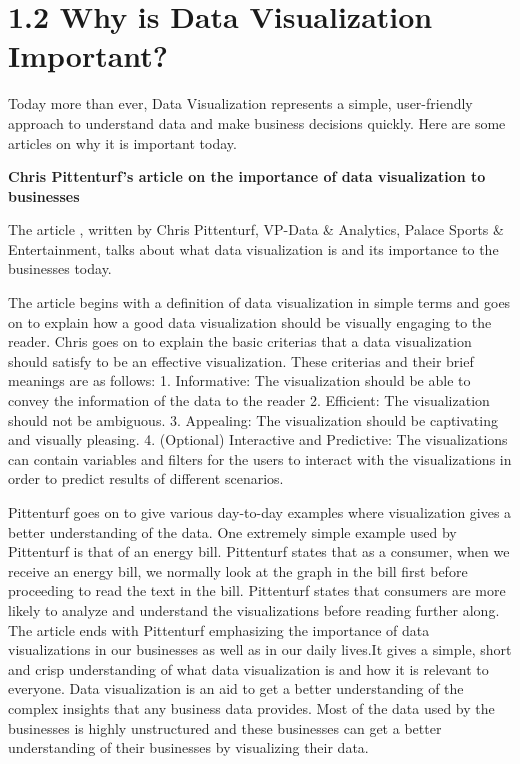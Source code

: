 \documentclass[]{book}
\theoremstyle{definition}
\theoremstyle{definition}
\theoremstyle{definition}
\theoremstyle{remark}
\begin{document}
\citep{info_viz}

\section{1.2 Why is Data Visualization
Important?}\label{why-is-data-visualization-important}

Today more than ever, Data Visualization represents a simple,
user-friendly approach to understand data and make business decisions
quickly. Here are some articles on why it is important today.

\textbf{Chris Pittenturf's article on the importance of data
visualization to businesses}

The article , written by Chris Pittenturf, VP-Data \& Analytics, Palace
Sports \& Entertainment, talks about what data visualization is and its
importance to the businesses today.

The article begins with a definition of data visualization in simple
terms and goes on to explain how a good data visualization should be
visually engaging to the reader. Chris goes on to explain the basic
criterias that a data visualization should satisfy to be an effective
visualization. These criterias and their brief meanings are as follows:
1. Informative: The visualization should be able to convey the
information of the data to the reader 2. Efficient: The visualization
should not be ambiguous. 3. Appealing: The visualization should be
captivating and visually pleasing. 4. (Optional) Interactive and
Predictive: The visualizations can contain variables and filters for the
users to interact with the visualizations in order to predict results of
different scenarios.

Pittenturf goes on to give various day-to-day examples where
visualization gives a better understanding of the data. One extremely
simple example used by Pittenturf is that of an energy bill. Pittenturf
states that as a consumer, when we receive an energy bill, we normally
look at the graph in the bill first before proceeding to read the text
in the bill. Pittenturf states that consumers are more likely to analyze
and understand the visualizations before reading further along. The
article ends with Pittenturf emphasizing the importance of data
visualizations in our businesses as well as in our daily lives.It gives
a simple, short and crisp understanding of what data visualization is
and how it is relevant to everyone. Data visualization is an aid to get
a better understanding of the complex insights that any business data
provides. Most of the data used by the businesses is highly unstructured
and these businesses can get a better understanding of their businesses
by visualizing their data.
\end{document}
